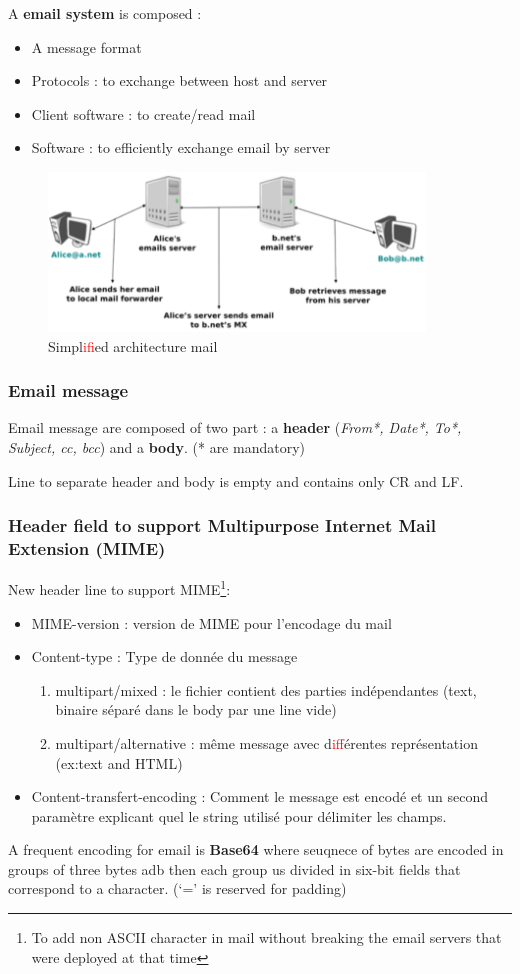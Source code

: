 A \textbf{email system} is composed :
\begin{itemize}
    \item A message format
    \item Protocols : to exchange between host and server
    \item Client software : to create/read mail
    \item Software : to efficiently exchange email by server
\end{itemize}
 
\begin{figure}[h]
    \centering
    \includegraphics[width=10cm]{mail.png}
    \caption{Simpl\textcolor{red}{if}ied architecture mail}
\end{figure}

\subsubsection{Email message}
Email message are composed of two part : a \textbf{header} (\textit{From*, Date*, To*, Subject,  cc, bcc}) and a \textbf{body}. (* are mandatory)

Line to separate header and body is empty and contains only CR and LF.

\subsubsection{Header field to support Multipurpose Internet Mail Extension (MIME)}
New header line to support MIME\footnote{To add non ASCII character in mail without
breaking the email servers that were deployed at that time}:
\begin{itemize}
    \item MIME-version : version de MIME pour l'encodage du mail
    \item Content-type : Type de donnée du message
        \begin{enumerate}
            \item multipart/mixed : le fichier contient des parties indépendantes (text, binaire séparé dans le body par une line vide)
            \item multipart/alternative : même message avec d\textcolor{red}{if}férentes représentation (ex:text and HTML)
        \end{enumerate}
    \item Content-transfert-encoding : Comment le message est encodé et un second paramètre explicant quel le string utilisé pour délimiter les champs.
\end{itemize}
 A frequent encoding for email is \textbf{Base64} where seuqnece of bytes are encoded in groups of three bytes adb then each group us divided in six-bit fields that correspond to a character. (`=' is reserved for padding)


